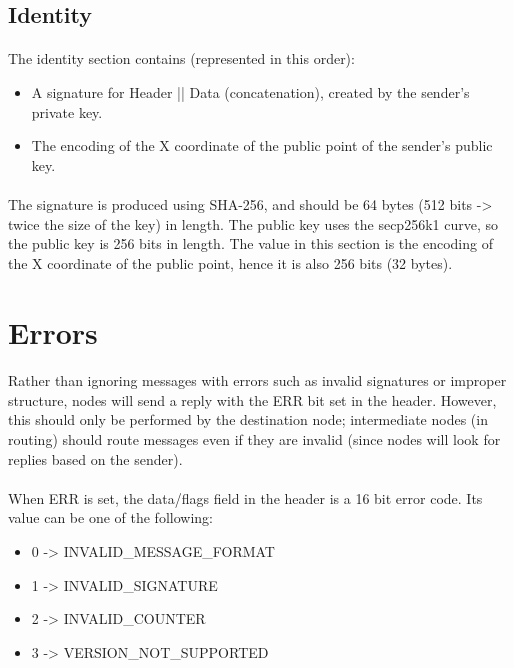 \documentclass{article}
\begin{document}
\subsection{Identity}

\paragraph{}
The identity section contains (represented in this order):

\begin{itemize}
\item A signature for {Header || Data} (concatenation), created by the sender's private key.
\item The encoding of the X coordinate of the public point of the sender's public key.
\end{itemize}

\paragraph{}
The signature is produced using SHA-256, and should be 64 bytes (512 bits -> twice the size of the key) in length. The public key uses the secp256k1 curve, so the public key is 256 bits in length. The value in this section is the encoding of the X coordinate of the public point, hence it is also 256 bits (32 bytes).

\section{Errors}

\paragraph{}
Rather than ignoring messages with errors such as invalid signatures or improper structure, nodes will send a reply with the ERR bit set in the header. However, this should only be performed by the destination node; intermediate nodes (in routing) should route messages even if they are invalid (since nodes will look for replies based on the sender).

\paragraph{}
When ERR is set, the data/flags field in the header is a 16 bit error code. Its value can be one of the following:

\begin{itemize}
\item 0 -> INVALID_MESSAGE_FORMAT
\item 1 -> INVALID_SIGNATURE
\item 2 -> INVALID_COUNTER
\item 3 -> VERSION_NOT_SUPPORTED
\end{itemize}
\end{document}
